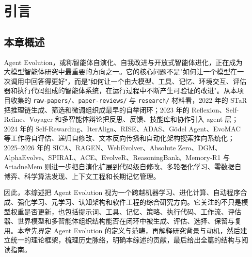 
\section{引言}\label{ch:intro}

\subsection{本章概述}

Agent Evolution，或称智能体自演化、自我改进与开放式智能体进化，正在成为大模型智能体研究中最重要的方向之一。它的核心问题不是"如何让一个模型在一次调用中回答得更好"，而是"如何让一个由大模型、工具、记忆、环境交互、评估器和执行代码组成的智能体系统，在运行过程中不断产生可验证的改进"。从本项目收集的 \texttt{raw-papers/}、\texttt{paper-reviews/} 与 \texttt{research/} 材料看，2022 年的 STaR 把推理链生成、筛选和微调组织成最早的自举闭环；2023 年的 Reflexion、Self-Refine、Voyager 和多智能体辩论把反思、反馈、技能库和协作引入 agent 层；2024 年的 Self-Rewarding、IterAlign、RISE、ADAS、Gödel Agent、EvoMAC 等工作将自评估、递归自修改、文本反向传播和自动化架构搜索推向系统化；2025--2026 年的 SICA、RAGEN、WebEvolver、Absolute Zero、DGM、AlphaEvolve、SPIRAL、ACE、EvolveR、ReasoningBank、Memory-R1 与 AriadneMem 则进一步把自演化扩展到代码级自修改、多轮强化学习、零数据自博弈、科学算法发现、上下文工程和长期记忆管理。

因此，本综述把 Agent Evolution 视为一个跨越机器学习、进化计算、自动程序合成、强化学习、元学习、认知架构和软件工程的综合研究方向。它关注的不只是模型权重是否更新，也包括提示词、工具、记忆、策略、执行代码、工作流、评估器、世界模型和多智能体组织结构能否在闭环中被生成、评估、选择、保留与复用。本章先界定 Agent Evolution 的定义与范畴，再解释研究背景与动机，然后建立统一的理论框架，梳理历史脉络，明确本综述的贡献，最后给出全篇的结构与阅读指南。

